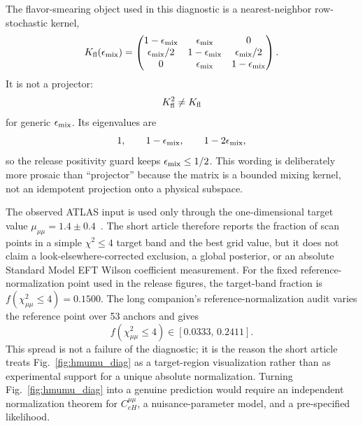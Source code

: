\documentclass[pdflatex,sn-mathphys-num,iicol]{sn-jnl}
\newcommand{\ReleaseHmumuChiTwoLeFour}{0.1500}
\begin{document}
The flavor-smearing object used in this diagnostic is a nearest-neighbor row-stochastic kernel,
\begin{equation}
    K_{\rm fl}(\epsilon_{\rm mix})
    =
    \begin{pmatrix}
    1-\epsilon_{\rm mix} & \epsilon_{\rm mix} & 0\\
    \epsilon_{\rm mix}/2 & 1-\epsilon_{\rm mix} & \epsilon_{\rm mix}/2\\
    0 & \epsilon_{\rm mix} & 1-\epsilon_{\rm mix}
    \end{pmatrix}.
    \label{eq:flavor_kernel}
\end{equation}
It is not a projector:
\begin{equation}
    K_{\rm fl}^2\ne K_{\rm fl}
\end{equation}
for generic \(\epsilon_{\rm mix}\).
Its eigenvalues are
\begin{equation}
    1,\qquad 1-\epsilon_{\rm mix},\qquad 1-2\epsilon_{\rm mix},
\end{equation}
so the release positivity guard keeps \(\epsilon_{\rm mix}\le1/2\).
This wording is deliberately more prosaic than ``projector'' because the matrix is a bounded mixing kernel, not an idempotent projection onto a physical subspace.

The observed ATLAS input is used only through the one-dimensional target value \(\mu_{\mu\mu}=1.4\pm0.4\)~\cite{ATLAS_Hmumu}.
The short article therefore reports the fraction of scan points in a simple \(\chi^2\le4\) target band and the best grid value, but it does not claim a look-elsewhere-corrected exclusion, a global posterior, or an absolute Standard Model EFT Wilson coefficient measurement.
For the fixed reference-normalization point used in the release figures, the target-band fraction is \(f(\chi^2_{\mu\mu}\le4)=\ReleaseHmumuChiTwoLeFour\).
The long companion's reference-normalization audit varies the reference point over 53 anchors and gives
\begin{equation}
    f(\chi^2_{\mu\mu}\le4)\in[0.0333,\,0.2411].
    \label{eq:hmumu_ref_sensitivity}
\end{equation}
This spread is not a failure of the diagnostic; it is the reason the short article treats Fig.~\ref{fig:hmumu_diag} as a target-region visualization rather than as experimental support for a unique absolute normalization.
Turning Fig.~\ref{fig:hmumu_diag} into a genuine prediction would require an independent normalization theorem for \(C_{eH}^{\mu\mu}\), a nuisance-parameter model, and a pre-specified likelihood.
\end{document}
